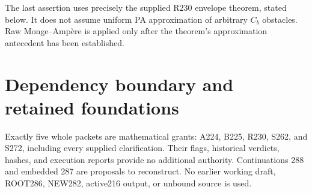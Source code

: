 \documentclass[11pt]{article}
\begin{document}
The last assertion uses precisely the supplied R230 envelope theorem, stated below. It does not assume uniform PA approximation of arbitrary $C_b$ obstacles. Raw Monge--Amp\`ere is applied only after the theorem's approximation antecedent has been established.

\section{Dependency boundary and retained foundations}
Exactly five whole packets are mathematical grants: A224, B225, R230, S262, and S272, including every supplied clarification. Their flags, historical verdicts, hashes, and execution reports provide no additional authority. Continuations 288 and embedded 287 are proposals to reconstruct. No earlier working draft, ROOT286, NEW282, active216 output, or unbound source is used.
\end{document}
